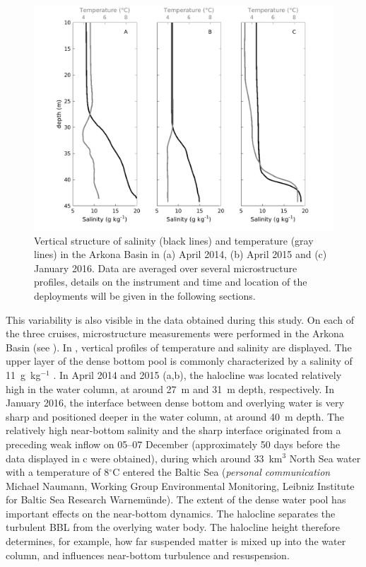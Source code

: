 \begin{figure}[ht]
\includegraphics[width=40pc]{bilder/arkona_TS.png}
 \caption{Vertical structure of salinity (black lines) and temperature (gray 
lines) in the Arkona Basin in (a) April 2014, (b) April 2015 and (c) January 
2016. Data are averaged over several microstructure profiles, details on the 
instrument and time and location of the deployments will be given in the 
following sections.}
 \label{TSarkona}
 \end{figure}
 
 This variability is also visible in the data obtained during this study. On 
each of the three cruises, microstructure measurements were performed in the 
Arkona Basin (see ). In , vertical profiles of 
temperature and salinity are displayed. The upper layer of the dense bottom pool 
is commonly characterized by a salinity of 11~g~kg$^{-1}$ \citep[][]{lass2005}. 
In April 2014 and 2015 (a,b), the halocline was located 
relatively high in the water column, at around 27~m and 31~m depth, 
respectively. In January 2016, the interface between dense bottom and overlying 
water is very sharp and positioned deeper in the water column, at around 40~m 
depth. The relatively high near-bottom salinity and the sharp interface 
originated from a preceding weak inflow on 05--07 December (approximately 50 
days before the data displayed in c were obtained), during which 
around 33~km$^3$ North Sea water with a temperature of 8$^\circ$C entered the 
Baltic Sea (\textit{personal communication} Michael Naumann, Working Group 
Environmental Monitoring, Leibniz Institute for Baltic Sea Research 
Warnemünde). The extent of the dense water pool has important effects on the 
near-bottom dynamics. The halocline separates the turbulent BBL from the 
overlying water body. The halocline height therefore determines, for example, 
how far suspended matter is mixed up into the water column, and influences 
near-bottom turbulence and resuspension.

